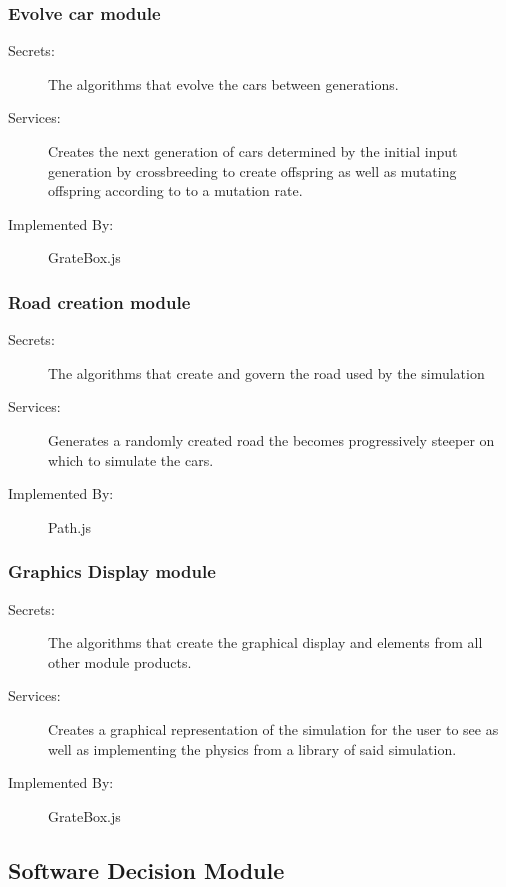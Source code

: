 \documentclass[12pt, titlepage]{article}
\begin{document}
\subsubsection{Evolve car module}

\begin{description}
\item[Secrets:] The algorithms that evolve the cars between generations.
\item[Services:] Creates the next generation of cars determined by the initial 
input generation by crossbreeding to create offspring as well as mutating 
offspring according to to a mutation rate.
\item[Implemented By:] \color{RoyalPurple}GrateBox.js
\end{description}

\subsubsection{Road creation module}

\begin{description}
\item[Secrets:] The algorithms that create and govern the road used by the 
simulation
\item[Services:] Generates a randomly created road the becomes progressively 
steeper on which to simulate the cars.
\item[Implemented By:] \color{RoyalPurple}Path.js
\end{description}

\subsubsection{Graphics Display module}

\begin{description}
\item[Secrets:] The algorithms that create the graphical display and elements 
from all other module products.
\item[Services:] Creates a graphical representation of the simulation for the 
user to see as well as implementing the physics from a library of said 
simulation.
\item[Implemented By:] \color{RoyalPurple}GrateBox.js
\end{description}

\subsection{Software Decision Module}
\end{document}
